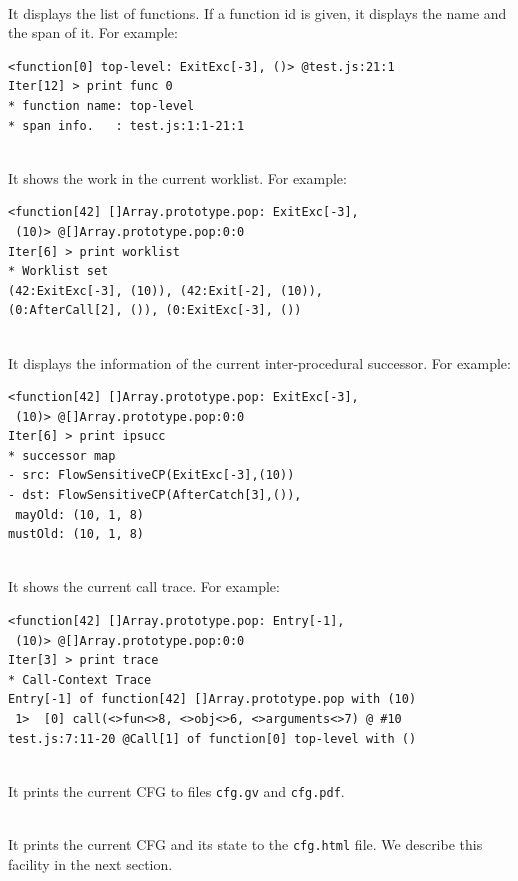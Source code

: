 \medskip\noindent
{}\\[.2em]
It displays the list of functions.
If a function id is given, it displays the name and the span of it.
For example:
{\small
\begin{verbatim}
<function[0] top-level: ExitExc[-3], ()> @test.js:21:1
Iter[12] > print func 0
* function name: top-level
* span info.   : test.js:1:1-21:1
\end{verbatim}
}

\medskip\noindent
{}\\[.2em]
It shows the work in the current worklist.  For example:
{\small
\begin{verbatim}
<function[42] []Array.prototype.pop: ExitExc[-3],
 (10)> @[]Array.prototype.pop:0:0
Iter[6] > print worklist
* Worklist set
(42:ExitExc[-3], (10)), (42:Exit[-2], (10)),
(0:AfterCall[2], ()), (0:ExitExc[-3], ())
\end{verbatim}
}

\medskip\noindent
{}\\[.2em]
It displays the information of the current inter-procedural successor.
For example:
{\small
\begin{verbatim}
<function[42] []Array.prototype.pop: ExitExc[-3],
 (10)> @[]Array.prototype.pop:0:0
Iter[6] > print ipsucc
* successor map
- src: FlowSensitiveCP(ExitExc[-3],(10))
- dst: FlowSensitiveCP(AfterCatch[3],()),
 mayOld: (10, 1, 8)
mustOld: (10, 1, 8)
\end{verbatim}
}

\medskip\noindent
{}\\[.2em]
It shows the current call trace.  For example:
{\small
\begin{verbatim}
<function[42] []Array.prototype.pop: Entry[-1],
 (10)> @[]Array.prototype.pop:0:0
Iter[3] > print trace
* Call-Context Trace
Entry[-1] of function[42] []Array.prototype.pop with (10)
 1>  [0] call(<>fun<>8, <>obj<>6, <>arguments<>7) @ #10
test.js:7:11-20 @Call[1] of function[0] top-level with ()
\end{verbatim}
}

\medskip\noindent
{}\\[.2em]
It prints the current CFG to files \verb!cfg.gv! and \verb!cfg.pdf!.

\medskip\noindent
{}\\[.2em]
It prints the current CFG and its state to the \verb!cfg.html! file.
We describe this facility in the next section.

